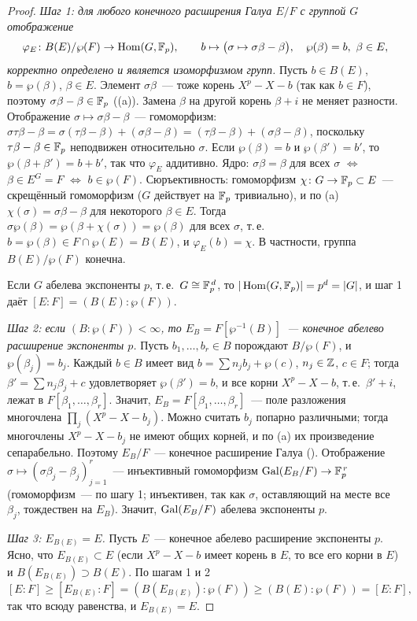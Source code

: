 \begin{proof}
\emph{Шаг 1: для любого конечного расширения Галуа $E/F$ с группой $G$ отображение
\[
\varphi_E\colon B(E)/\wp(F)\to\Hom(G,\F_p),\qquad b\mapsto\bigl(\sigma\mapsto\sigma\beta-\beta\bigr),\quad\wp(\beta)=b,\ \beta\in E,
\]
корректно определено и является изоморфизмом групп.} Пусть $b\in B(E)$, $b=\wp(\beta)$, $\beta\in E$. Элемент $\sigma\beta$~---
тоже корень $X^p-X-b$ (так как $b\in F$), поэтому $\sigma\beta-\beta\in\mathbb F_p$ ((a)). Замена $\beta$ на другой корень
$\beta+i$ не меняет разности. Отображение $\sigma\mapsto\sigma\beta-\beta$~--- гомоморфизм:
$\sigma\tau\beta-\beta=\sigma(\tau\beta-\beta)+(\sigma\beta-\beta)=(\tau\beta-\beta)+(\sigma\beta-\beta)$, поскольку
$\tau\beta-\beta\in\mathbb F_p$ неподвижен относительно $\sigma$. Если $\wp(\beta)=b$ и $\wp(\beta')=b'$, то
$\wp(\beta+\beta')=b+b'$, так что $\varphi_E$ аддитивно. Ядро: $\sigma\beta=\beta$ для всех $\sigma$ $\iff$
$\beta\in E^G=F$ $\iff$ $b\in\wp(F)$. Сюръективность: гомоморфизм $\chi\colon G\to\mathbb F_p\subset E$~--- скрещённый
гомоморфизм ($G$ действует на $\mathbb F_p$ тривиально), и по (a) $\chi(\sigma)=\sigma\beta-\beta$ для некоторого
$\beta\in E$. Тогда $\sigma\wp(\beta)=\wp(\beta+\chi(\sigma))=\wp(\beta)$ для всех $\sigma$, т.\,е.\
$b=\wp(\beta)\in F\cap\wp(E)=B(E)$, и $\varphi_E(b)=\chi$. В частности, группа $B(E)/\wp(F)$ конечна.

Если $G$ абелева экспоненты $p$, т.\,е.\ $G\cong\mathbb F_p^{\,d}$, то $|\operatorname{Hom}(G,\mathbb F_p)|=p^d=|G|$, и шаг 1 даёт $[E:F]=(B(E):\wp(F))$.

\emph{Шаг 2: если $(B:\wp(F))<\infty$, то $E_B=F[\wp^{-1}(B)]$~--- конечное абелево расширение экспоненты $p$.} Пусть
$b_1,\dots,b_r\in B$ порождают $B/\wp(F)$, и $\wp(\beta_j)=b_j$. Каждый $b\in B$ имеет вид $b=\sum n_jb_j+\wp(c)$, $n_j\in\mathbb Z$,
$c\in F$; тогда $\beta'=\sum n_j\beta_j+c$ удовлетворяет $\wp(\beta')=b$, и все корни $X^p-X-b$, т.\,е.\ $\beta'+i$, лежат в
$F[\beta_1,\dots,\beta_r]$. Значит, $E_B=F[\beta_1,\dots,\beta_r]$~--- поле разложения многочлена
$\prod_j(X^p-X-b_j)$. Можно считать $b_j$ попарно различными; тогда многочлены $X^p-X-b_j$ не имеют общих корней, и
по \rf{5.32c}(a) их произведение сепарабельно. Поэтому $E_B/F$~--- конечное расширение Галуа (\rf{3.10}). Отображение $\sigma\mapsto(\sigma\beta_j-\beta_j)_{j=1}^r$~--- инъективный гомоморфизм
$\operatorname{Gal}(E_B/F)\to\mathbb F_p^{\,r}$ (гомоморфизм~--- по шагу 1; инъективен, так как $\sigma$, оставляющий на месте все $\beta_j$,
тождествен на $E_B$). Значит, $\operatorname{Gal}(E_B/F)$ абелева экспоненты $p$.

\emph{Шаг 3: $E_{B(E)}=E$.} Пусть $E$~--- конечное абелево расширение экспоненты $p$. Ясно, что $E_{B(E)}\subset E$ (если
$X^p-X-b$ имеет корень в $E$, то все его корни в $E$) и $B(E_{B(E)})\supset B(E)$. По шагам 1 и 2
\[
[E:F]\ge[E_{B(E)}:F]=(B(E_{B(E)}):\wp(F))\ge(B(E):\wp(F))=[E:F],
\]
так что всюду равенства, и $E_{B(E)}=E$.


\end{proof}
